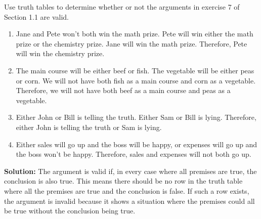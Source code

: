 Use truth tables to determine whether or not the arguments in exercise 7 of Section 1.1 are valid.

\begin{enumerate}[label=(\alph*)]
    \item Jane and Pete won't both win the math prize. Pete will win either the math prize or the chemistry prize. Jane will win the math prize. Therefore, Pete will win the chemistry prize.
    \item The main course will be either beef or fish. The vegetable will be either peas or corn. We will not have both fish as a main course and corn as a vegetable. Therefore, we will not have both beef as a main course and peas as a vegetable.
    \item Either John or Bill is telling the truth. Either Sam or Bill is lying. Therefore, either John is telling the truth or Sam is lying.
    \item Either sales will go up and the boss will be happy, or expenses will go up and the boss won't be happy. Therefore, sales and expenses will not both go up.
\end{enumerate} 

\textbf{Solution:} The argument is valid if, in every case where all premises are true, the conclusion is also true. This means there should be no row in the truth table where all the premises are true and the conclusion is false. If such a row exists, the argument is invalid because it shows a situation where the premises could all be true without the conclusion being true.


